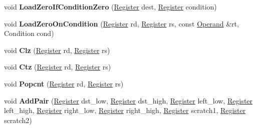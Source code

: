 \begin{DoxyCompactItemize}
void {\bfseries Load\+Zero\+If\+Condition\+Zero} (\mbox{\hyperlink{classv8_1_1internal_1_1Register}{Register}} dest, \mbox{\hyperlink{classv8_1_1internal_1_1Register}{Register}} condition)
\item 
\mbox{\label{classv8_1_1internal_1_1TurboAssembler_aa963248999ff08a2b99cb3069ee80604}} 
void {\bfseries Load\+Zero\+On\+Condition} (\mbox{\hyperlink{classv8_1_1internal_1_1Register}{Register}} rd, \mbox{\hyperlink{classv8_1_1internal_1_1Register}{Register}} rs, const \mbox{\hyperlink{classv8_1_1internal_1_1Operand}{Operand}} \&rt, Condition cond)
\item 
\mbox{\label{classv8_1_1internal_1_1TurboAssembler_a7457dbd291f309e7850e502d28b9ffe2}} 
void {\bfseries Clz} (\mbox{\hyperlink{classv8_1_1internal_1_1Register}{Register}} rd, \mbox{\hyperlink{classv8_1_1internal_1_1Register}{Register}} rs)
\item 
\mbox{\label{classv8_1_1internal_1_1TurboAssembler_a9f75ffc2e7c4792cb20920e04385b0e3}} 
void {\bfseries Ctz} (\mbox{\hyperlink{classv8_1_1internal_1_1Register}{Register}} rd, \mbox{\hyperlink{classv8_1_1internal_1_1Register}{Register}} rs)
\item 
\mbox{\label{classv8_1_1internal_1_1TurboAssembler_a6db87a88099d88cb9e3396ae729a3ca6}} 
void {\bfseries Popcnt} (\mbox{\hyperlink{classv8_1_1internal_1_1Register}{Register}} rd, \mbox{\hyperlink{classv8_1_1internal_1_1Register}{Register}} rs)
\item 
\mbox{\label{classv8_1_1internal_1_1TurboAssembler_a0fc739a0de7a1e1c9b375fba9275c0a9}} 
void {\bfseries Add\+Pair} (\mbox{\hyperlink{classv8_1_1internal_1_1Register}{Register}} dst\+\_\+low, \mbox{\hyperlink{classv8_1_1internal_1_1Register}{Register}} dst\+\_\+high, \mbox{\hyperlink{classv8_1_1internal_1_1Register}{Register}} left\+\_\+low, \mbox{\hyperlink{classv8_1_1internal_1_1Register}{Register}} left\+\_\+high, \mbox{\hyperlink{classv8_1_1internal_1_1Register}{Register}} right\+\_\+low, \mbox{\hyperlink{classv8_1_1internal_1_1Register}{Register}} right\+\_\+high, \mbox{\hyperlink{classv8_1_1internal_1_1Register}{Register}} scratch1, \mbox{\hyperlink{classv8_1_1internal_1_1Register}{Register}} scratch2)

\end{DoxyCompactItemize}
